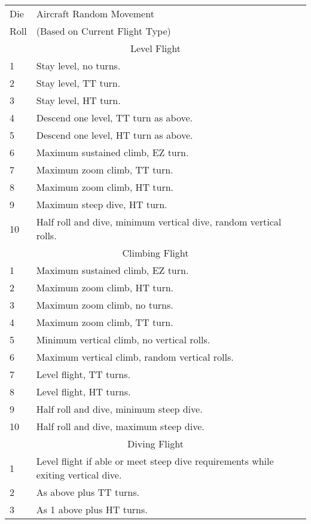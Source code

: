 \begin{onecolumntablefloat}
\begin{onecolumntable}

\small
\begin{tabularx}{\linewidth}{lX}
\toprule
Die&Aircraft Random Movement\\
Roll&(Based on Current Flight Type)\\
\midrule
\multicolumn{2}{c}{Level Flight}\\
\midrule
1   &Stay level, no turns.\\
2   &Stay level, TT turn.\\
3   &Stay level, HT turn.\\
4   &Descend one level, TT turn as above.\\
5   &Descend one level, HT turn as above.\\
6   &Maximum sustained climb, EZ turn.\\
7   &Maximum zoom climb, TT turn.\\
8   &Maximum zoom climb, HT turn.\\
9   &Maximum steep dive, HT turn.\\
10  &Half roll and dive, minimum vertical dive, random vertical rolls.\\
\midrule
\multicolumn{2}{c}{Climbing Flight}\\
\midrule
1   &Maximum sustained climb, EZ turn.\\
2   &Maximum zoom climb, HT turn.\\
3   &Maximum zoom climb, no turns.\\
4   &Maximum zoom climb, TT turn.\\
5   &Minimum vertical climb, no vertical rolls.\\
6   &Maximum vertical climb, random vertical rolls.\\
7   &Level flight, TT turns.\\
8   &Level flight, HT turns.\\
9   &Half roll and dive, minimum steep dive.\\
10  &Half roll and dive, maximum steep dive.\\
\midrule
\multicolumn{2}{c}{Diving Flight}\\
\midrule
1   &Level flight if able or meet steep dive requirements while exiting vertical dive.\\
2   &As above plus TT turns.\\
3   &As 1 above plus HT turns.\\

\end{tabularx}
\end{onecolumntable}
\end{onecolumntablefloat}
